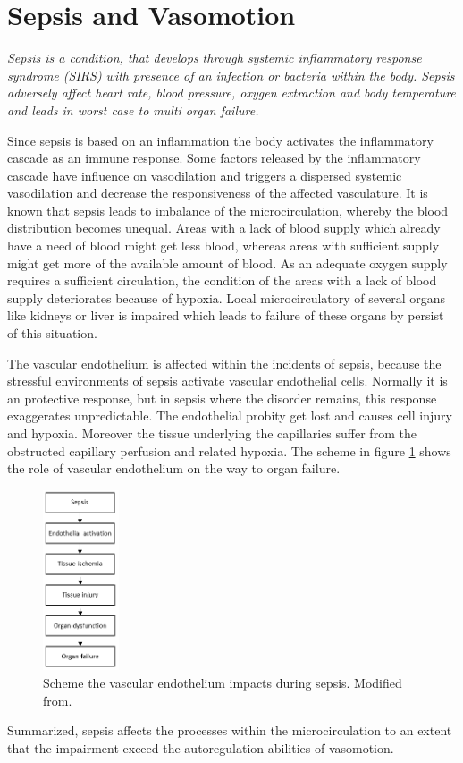 
\label{chap:sepsis}
\section{Sepsis and Vasomotion}

\textit{Sepsis is a condition, that develops through systemic inflammatory response syndrome (SIRS) with presence of an infection or bacteria within the body. Sepsis adversely affect heart rate, blood pressure, oxygen extraction and body temperature and leads in worst case to multi organ failure.\cite{pluta2010,kanta2014}}

Since sepsis is based on an inflammation the body activates the inflammatory cascade as an immune response. Some factors released by the inflammatory cascade have influence on vasodilation and triggers a dispersed systemic vasodilation and decrease the responsiveness of the affected vasculature. It is known that sepsis leads to imbalance of the microcirculation, whereby the blood distribution becomes unequal. Areas with a lack of blood supply which already have a need of blood might get less blood, whereas areas with sufficient supply might get more of the available amount of blood. As an adequate oxygen supply requires a sufficient circulation, the condition of the areas with a lack of blood supply deteriorates because of hypoxia.
Local microcirculatory of several organs like kidneys or liver is impaired which leads to failure of these organs by persist of this situation.\cite{baudouin2008,kanta2014}

The vascular endothelium is affected within the incidents of sepsis, because the stressful environments of sepsis activate vascular endothelial cells. Normally it is an protective response, but in sepsis where the disorder remains, this response exaggerates unpredictable. The endothelial probity get lost and causes cell injury and hypoxia. Moreover the tissue underlying the capillaries suffer from the obstructed capillary perfusion and related hypoxia. The scheme in figure \ref{fig:Sepsis} shows the role of vascular endothelium on the way to organ failure.\cite{baudouin2008}

\begin{figure}[H]
	\centering	\includegraphics[width=0.2\textwidth]{figures/SepsisEndo}
	\caption{Scheme the vascular endothelium impacts during sepsis. Modified from\cite{baudouin2008}.}
	\label{fig:Sepsis}
\end{figure}

Summarized, sepsis affects the processes within the microcirculation to an extent that the impairment exceed the autoregulation abilities of vasomotion.